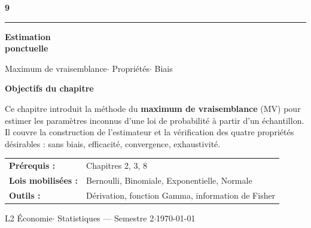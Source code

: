 \documentclass[11pt,a4paper]{article}
\begin{document}
\thispagestyle{empty}


\vspace*{0.4cm}
\hspace*{2.2cm}%
\begin{minipage}[t]{0.85\textwidth}
  \vspace{1.5cm}
  {\fontsize{120}{120}\selectfont\sffamily\bfseries\color{white}9}

  \vspace{0.1cm}
  {\color{amber}\rule{10cm}{2.5pt}}

  \vspace{0.5cm}
  {\fontsize{22}{26}\selectfont\sffamily\bfseries\color{white}%
    Estimation\\[0.1cm]ponctuelle}

  \vspace{1cm}
  {\large\sffamily\color{white!70!navydark}%
    Maximum de vraisemblance\quad$\cdot$\quad
    Propri\'et\'es\quad$\cdot$\quad
    Biais}
\end{minipage}

\vspace{3.6cm}
\hspace*{2.2cm}%
\begin{minipage}[t]{0.85\textwidth}
  \begin{tcolorbox}[enhanced,colback=navylight,colframe=navydark,
    boxrule=0pt,leftrule=4pt,arc=2pt,top=10pt,bottom=10pt,left=12pt,right=12pt]
  \sffamily\color{textprimary}
  \textbf{Objectifs du chapitre}

  \smallskip
  Ce chapitre introduit la m\'ethode du \textbf{maximum de vraisemblance} (MV) pour
  estimer les param\`etres inconnus d'une loi de probabilit\'e \`a partir d'un \'echantillon.
  Il couvre la construction de l'estimateur et la v\'erification des quatre propri\'et\'es
  d\'esirables : sans biais, efficacit\'e, convergence, exhaustivit\'e.

  \medskip
  \begin{tabular}{@{}ll@{}}
  \textbf{Pr\'erequis :} & Chapitres 2, 3, 8 \\
  \textbf{Lois mobilis\'ees :} & Bernoulli, Binomiale, Exponentielle, Normale \\
  \textbf{Outils :} & D\'erivation, fonction Gamma, information de Fisher \\
  \end{tabular}
  \end{tcolorbox}

  \vfill
  \textcolor{textsecondary}{\sffamily\small L2 \'Economie\quad$\cdot$\quad
    Statistiques --- Semestre 2\quad$\cdot$\quad \today}
\end{minipage}
\end{document}
